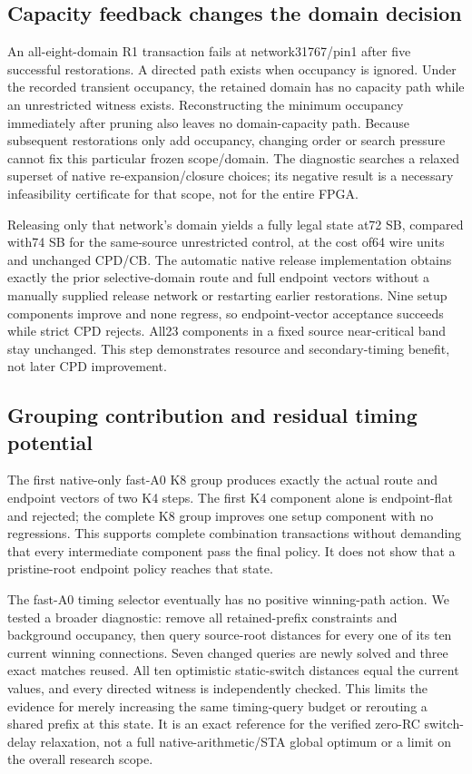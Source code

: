 \documentclass[conference,10pt]{IEEEtran}
\begin{document}
\subsection{Capacity feedback changes the domain decision}
An all-eight-domain R1 transaction fails at network31767/pin1 after five successful restorations. A directed path exists when occupancy is ignored. Under the recorded transient occupancy, the retained domain has no capacity path while an unrestricted witness exists. Reconstructing the minimum occupancy immediately after pruning also leaves no domain-capacity path. Because subsequent restorations only add occupancy, changing order or search pressure cannot fix this particular frozen scope/domain. The diagnostic searches a relaxed superset of native re-expansion/closure choices; its negative result is a necessary infeasibility certificate for that scope, not for the entire FPGA.

Releasing only that network's domain yields a fully legal state at72 SB, compared with74 SB for the same-source unrestricted control, at the cost of64 wire units and unchanged CPD/CB. The automatic native release implementation obtains exactly the prior selective-domain route and full endpoint vectors without a manually supplied release network or restarting earlier restorations. Nine setup components improve and none regress, so endpoint-vector acceptance succeeds while strict CPD rejects. All23 components in a fixed source near-critical band stay unchanged. This step demonstrates resource and secondary-timing benefit, not later CPD improvement.

\subsection{Grouping contribution and residual timing potential}
The first native-only fast-A0 K8 group produces exactly the actual route and endpoint vectors of two K4 steps. The first K4 component alone is endpoint-flat and rejected; the complete K8 group improves one setup component with no regressions. This supports complete combination transactions without demanding that every intermediate component pass the final policy. It does not show that a pristine-root endpoint policy reaches that state.

The fast-A0 timing selector eventually has no positive winning-path action. We tested a broader diagnostic: remove all retained-prefix constraints and background occupancy, then query source-root distances for every one of its ten current winning connections. Seven changed queries are newly solved and three exact matches reused. All ten optimistic static-switch distances equal the current values, and every directed witness is independently checked. This limits the evidence for merely increasing the same timing-query budget or rerouting a shared prefix at this state. It is an exact reference for the verified zero-RC switch-delay relaxation, not a full native-arithmetic/STA global optimum or a limit on the overall research scope.
\end{document}
